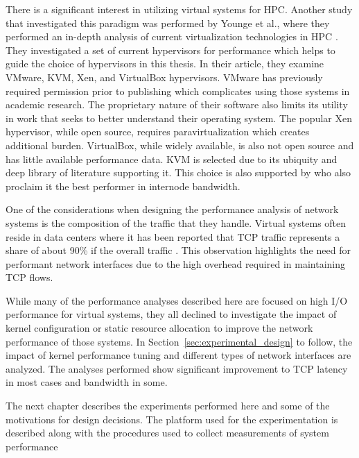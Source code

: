 There is a significant interest in utilizing virtual systems for HPC.  Another study that investigated this paradigm was performed by Younge et al., where they performed an in-depth analysis of current virtualization technologies in HPC \autocite{_younge_1}.
They investigated a set of current hypervisors for performance which helps to guide the choice of hypervisors in this thesis. 
In their article, they examine VMware, KVM, Xen, and VirtualBox hypervisors. 
VMware has previously required permission prior to publishing which complicates using those systems in academic research.  
The proprietary nature of their software also limits its utility in work that seeks to better understand their operating system.  
The popular Xen hypervisor, while open source, requires paravirtualization which creates additional burden.
VirtualBox, while widely available, is also not open source and has little available performance data.  
KVM is selected due to its ubiquity and deep library of literature supporting it.
This choice is also supported by \autocite{_younge_1} who also proclaim it the best performer in internode bandwidth.  

One of the considerations when designing the performance analysis of network systems is the composition of the traffic that they handle.  
Virtual systems often reside in data centers where it has been reported that TCP traffic represents a share of about 90\% if the overall traffic \autocite{haTCPCloud2013}.
This observation highlights the need for performant network interfaces due to the high overhead required in maintaining TCP flows.

While many of the performance analyses described here are focused on high I/O performance for virtual systems, they all declined to investigate the impact of kernel configuration or static resource allocation to improve the network performance of those systems.  
In Section~\ref{sec:experimental_design} to follow, the impact of kernel performance tuning and different types of network interfaces are analyzed.  
The analyses performed show significant improvement to TCP latency in most cases and bandwidth in some.

The next chapter describes the experiments performed here and some of the motivations for design decisions. 
The platform used for the experimentation is described along with the procedures used to collect measurements of system performance


\nocite{_dpdk_1, _adams_1, _chowdhury_1, seo2014performance, gomes2014performance, kivity2014osv, wang2011understanding}

